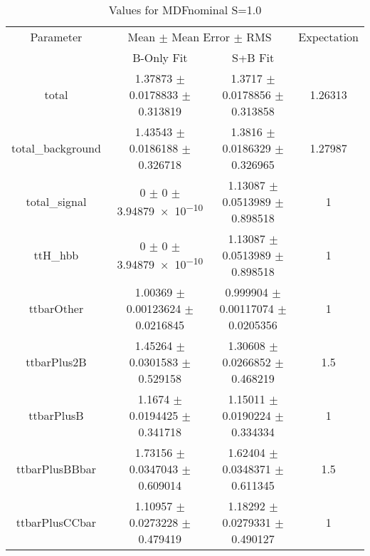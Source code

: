 \begin{table}
\centering
\caption{Values for MDFnominal S=1.0}
\begin{tabular}{cccc}
\toprule
Parameter & \multicolumn{2}{c}{Mean $\pm$ Mean Error $\pm$ RMS} & Expectation\\
 & B-Only Fit & S+B Fit & \\
\midrule
total & \num{1.37873} $\pm$ \num{0.0178833} $\pm$ \num{0.313819} & \num{1.3717} $\pm$ \num{0.0178856} $\pm$ \num{0.313858} & \num{1.26313}\\
total\_background & \num{1.43543} $\pm$ \num{0.0186188} $\pm$ \num{0.326718} & \num{1.3816} $\pm$ \num{0.0186329} $\pm$ \num{0.326965} & \num{1.27987}\\
total\_signal & \num{0} $\pm$ \num{0} $\pm$ \num{3.94879e-10} & \num{1.13087} $\pm$ \num{0.0513989} $\pm$ \num{0.898518} & \num{1}\\
ttH\_hbb & \num{0} $\pm$ \num{0} $\pm$ \num{3.94879e-10} & \num{1.13087} $\pm$ \num{0.0513989} $\pm$ \num{0.898518} & \num{1}\\
ttbarOther & \num{1.00369} $\pm$ \num{0.00123624} $\pm$ \num{0.0216845} & \num{0.999904} $\pm$ \num{0.00117074} $\pm$ \num{0.0205356} & \num{1}\\
ttbarPlus2B & \num{1.45264} $\pm$ \num{0.0301583} $\pm$ \num{0.529158} & \num{1.30608} $\pm$ \num{0.0266852} $\pm$ \num{0.468219} & \num{1.5}\\
ttbarPlusB & \num{1.1674} $\pm$ \num{0.0194425} $\pm$ \num{0.341718} & \num{1.15011} $\pm$ \num{0.0190224} $\pm$ \num{0.334334} & \num{1}\\
ttbarPlusBBbar & \num{1.73156} $\pm$ \num{0.0347043} $\pm$ \num{0.609014} & \num{1.62404} $\pm$ \num{0.0348371} $\pm$ \num{0.611345} & \num{1.5}\\
ttbarPlusCCbar & \num{1.10957} $\pm$ \num{0.0273228} $\pm$ \num{0.479419} & \num{1.18292} $\pm$ \num{0.0279331} $\pm$ \num{0.490127} & \num{1}\\
\bottomrule
\end{tabular}
\end{table}